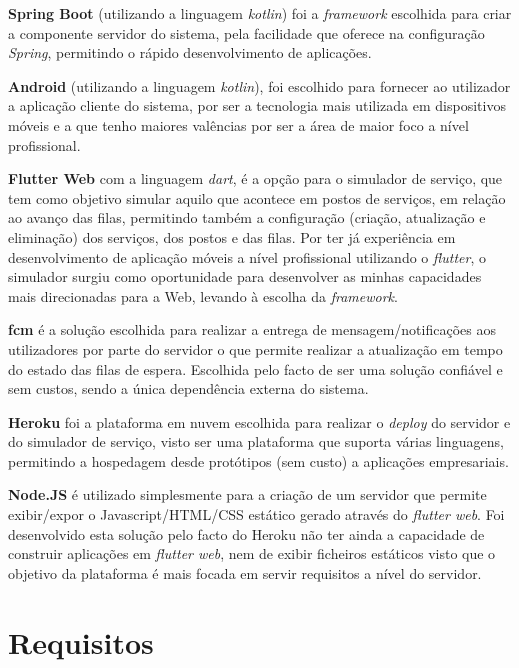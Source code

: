 \textbf{Spring Boot} \cite{spring} (utilizando a linguagem \textit{kotlin}) foi a \textit{framework} escolhida para criar a componente servidor do sistema, pela facilidade que oferece na configuração \textit{Spring}, permitindo o rápido desenvolvimento de aplicações. 

\textbf{Android} (utilizando a linguagem \textit{kotlin}), foi escolhido para fornecer ao utilizador a aplicação cliente do sistema, por ser a tecnologia mais utilizada em dispositivos móveis e a que tenho maiores valências por ser a área de maior foco a nível profissional. 	

\textbf{Flutter Web} \cite{flutter} com a linguagem \textit{dart}, é a opção para o simulador de serviço, que tem como objetivo simular aquilo que acontece em postos de serviços, em relação ao avanço das filas, permitindo também a configuração (criação, atualização e eliminação) dos serviços, dos postos e das filas. Por ter já experiência em desenvolvimento de aplicação móveis a nível profissional utilizando o \textit{flutter}, o simulador surgiu como oportunidade para desenvolver as minhas capacidades mais direcionadas para a Web, levando à escolha da \textit{framework}. 

\textbf{\acrfull{fcm}} \cite{firebase} é a solução escolhida para realizar a entrega de mensagem/notificações aos utilizadores por parte do servidor o que permite realizar a atualização em tempo do estado das filas de espera. Escolhida pelo facto de ser uma solução confiável e sem custos, sendo a única dependência externa do sistema.  

\textbf{Heroku} \cite{heroku} foi a plataforma em nuvem escolhida para realizar o \textit{deploy} do servidor e do simulador de serviço, visto ser uma plataforma que suporta várias linguagens, permitindo a hospedagem desde protótipos (sem custo) a aplicações empresariais. 

\textbf{Node.JS} \cite{nodejs} é utilizado simplesmente para a criação de um servidor que permite exibir/expor o Javascript/HTML/CSS estático gerado através do \textit{flutter web}. Foi desenvolvido esta solução pelo facto do Heroku não ter ainda a capacidade de construir aplicações em \textit{flutter web}, nem de exibir ficheiros estáticos visto que o objetivo da plataforma é mais focada em servir requisitos a nível do servidor. 

\section{Requisitos}

